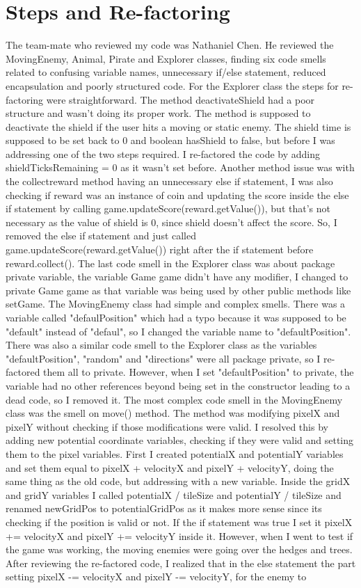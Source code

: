 \documentclass[12pt, letterpaper]{article}
\begin{document}
\section{Steps and Re-factoring}
The team-mate who reviewed my code was Nathaniel Chen. He reviewed the MovingEnemy, Animal, Pirate and Explorer classes, finding six code smells related to confusing variable names, unnecessary if/else statement, reduced encapsulation and poorly structured code. For the Explorer class the steps for re-factoring were straightforward. The method deactivateShield had a poor structure and wasn't doing its proper work. The method is supposed to deactivate the shield if the user hits a moving or static enemy. The shield time is supposed to be set back to 0 and boolean hasShield to false, but before I was addressing one of the two steps required. I re-factored the code by adding shieldTicksRemaining = 0 as it wasn't set before. Another method issue was with the collectreward method having an unnecessary else if statement, I was also checking if reward was an instance of coin and updating the score inside the else if statement by calling game.updateScore(reward.getValue()), but that's not necessary as the value of shield is 0, since shield doesn't affect the score. So, I removed the else if statement and just called game.updateScore(reward.getValue()) right after the if statement before reward.collect(). The last code smell in the Explorer class was about package private variable, the variable Game game didn't have any modifier, I changed to private Game game as that variable was being used by other public methods like setGame. The MovingEnemy class had simple and complex smells. There was a variable called "defaulPosition" which had a typo because it was supposed to be "default" instead of "defaul", so I changed the variable name to "defaultPosition". There was also a similar code smell to the Explorer class as the variables "defaultPosition", "random" and "directions" were all package private, so I re-factored them all to private. However, when I set "defaultPosition" to private, the variable had no other references beyond being set in the constructor leading to a dead code, so I removed it. The most complex code smell in the MovingEnemy class was the smell on move() method. The method was modifying pixelX and pixelY without checking if those modifications were valid. I resolved this by adding new potential coordinate variables, checking if they were valid and setting them to the pixel variables. First I created potentialX and potentialY variables and set them equal to pixelX + velocityX and pixelY + velocityY, doing the same thing as the old code, but addressing with a new variable. Inside the gridX and gridY variables I called potentialX / tileSize and potentialY / tileSize and renamed newGridPos to potentialGridPos as it makes more sense since its checking if the position is valid or not. If the if statement was true I set it pixelX += velocityX and pixelY += velocityY inside it. However, when I went to test if the game was working, the moving enemies were going over the hedges and trees. After reviewing the re-factored code, I realized that in the else statement the part setting pixelX -= velocityX and pixelY -= velocityY, for the enemy to 
\end{document}
